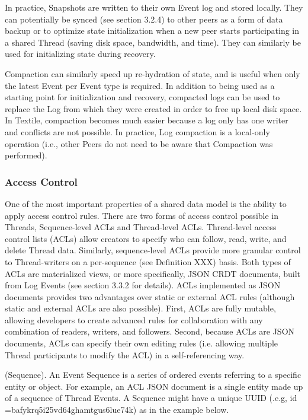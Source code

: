 \documentclass{comjnl}
\begin{document}
In practice, Snapshots are written to their own Event log and stored locally. They can potentially be synced (see section 3.2.4) to other peers as a form of data backup or to optimize state initialization when a new peer starts participating in a shared Thread (saving disk space, bandwidth, and time). They can similarly be used for initializing state during recovery.

Compaction can similarly speed up re-hydration of state, and is useful when only the latest Event per Event type is required. In addition to being used as a starting point for initialization and recovery, compacted logs can be used to replace the Log from which they were created in order to free up local disk space. In Textile, compaction becomes much easier because a log only has one writer and conflicts are not possible. In practice, Log compaction is a local-only operation (i.e., other Peers do not need to be aware that Compaction was performed).

\subsubsection{Access Control} \label{sec:AccessControl}

One of the most important properties of a shared data model is the ability to apply access control rules. There are two forms of access control possible in Threads, Sequence-level ACLs and Thread-level ACLs. Thread-level access control lists (ACLs) allow creators to specify who can follow, read, write, and delete Thread data. Similarly, sequence-level ACLs provide more granular control to Thread-writers on a per-sequence (see Definition XXX) basis. Both types of ACLs are materialized views, or more specifically, JSON CRDT documents, built from Log Events (see section 3.3.2 for details). ACLs implemented as JSON documents provides two advantages over static or external ACL rules (although static and external ACLs are also possible). First, ACLs are fully mutable, allowing developers to create advanced rules for collaboration with any combination of readers, writers, and followers. Second, because ACLs are JSON documents, ACLs can specify their own editing rules (i.e. allowing multiple Thread participants to modify the ACL) in a self-referencing way.

\begin{definition}
(Sequence). An Event Sequence is a series of ordered events referring to a specific entity or object. For example, an ACL JSON document is a single entity made up of a sequence of Thread Events. A Sequence might have a unique UUID (.e.g, id =bafykrq5i25vd64ghamtgus6lue74k) as in the example below.
\end{definition}
\end{document}
